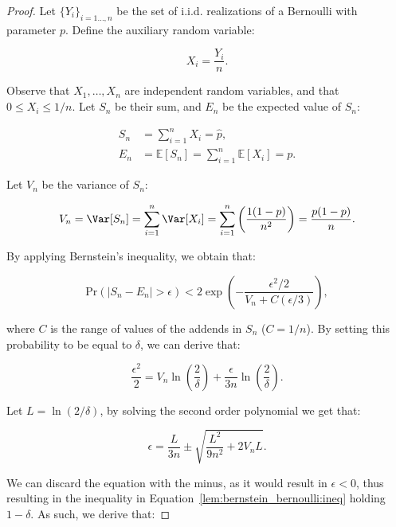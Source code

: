 \begin{proof}
    Let $\{Y_i\}_{i=1 \ldots, n}$ be the set of i.i.d. realizations of a Bernoulli with parameter $p$. Define the auxiliary random variable:

    \begin{equation*}
        X_i = \frac{Y_i}{n}.
    \end{equation*}

    Observe that $X_1, \ldots, X_n$ are independent random variables, and that $0 \le X_i \le 1/n$. Let $S_n$ be their sum, and $E_n$ be the expected value of $S_n$:

    \begin{align}
        S_n &= \sum_{i=1}^n X_i = \widehat{p}, \nonumber \\
        E_n &= \mathbb{E}[S_n] = \sum_{i=1}^n \mathbb{E}[X_i] = p. \nonumber
    \end{align}

    Let $V_n$ be the variance of $S_n$:

    \begin{equation*}
        V_n = \Var [S_n] = \sum_{i=1}^n \Var [X_i] = \sum_{i=1}^n \left( \frac{1(1-p)}{n^2} \right) = \frac{p(1-p)}{n}.
    \end{equation*}

    By applying Bernstein's inequality, we obtain that:

    \begin{equation}
    \label{lem:bernstein_bernoulli:ineq}
        \mathrm{Pr}(|S_n - E_n| > \epsilon) < 2 \exp\left(- \frac{\epsilon^2 / 2}{V_n + C(\epsilon/3)}\right),
    \end{equation}

    where $C$ is the range of values of the addends in $S_n$ (\ie $C=1/n$). By setting this probability to be equal to $\delta$, we can derive that:

    \begin{equation*}
        \frac{\epsilon^2}{2} = V_n \ln\left(\frac{2}{\delta}\right) + \frac{\epsilon}{3n} \ln \left(\frac{2}{\delta}\right).
    \end{equation*}

    Let $L= \ln(2/\delta)$, by solving the second order polynomial we get that:

    \begin{equation*}
        \epsilon = \frac{L}{3n} \pm \sqrt{\frac{L^2}{9n^2} + 2 V_n L}.
    \end{equation*}

    We can discard the equation with the minus, as it would result in $\epsilon < 0$, thus resulting in the inequality in Equation~\eqref{lem:bernstein_bernoulli:ineq} holding \wp $1 - \delta$. As such, we derive that:


\end{proof}
